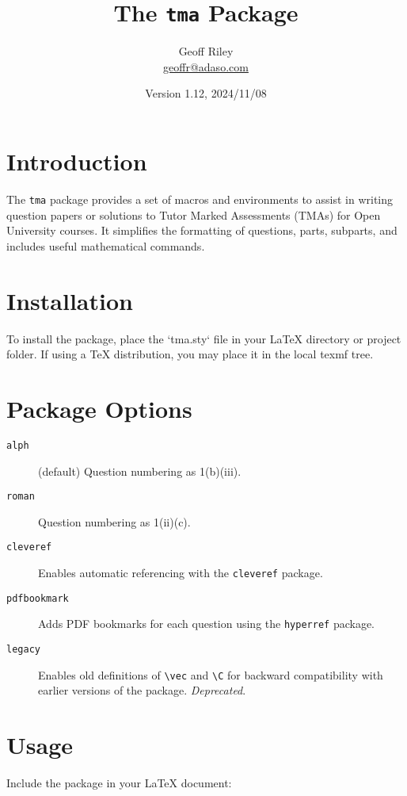 \documentclass{article}
\title{The \texttt{tma} Package}
\author{Geoff Riley \\ \href{mailto:geoffr@adaso.com.com}{geoffr@adaso.com}}
\date{Version 1.12, 2024/11/08}
\begin{document}
	
	\maketitle
	
	\tableofcontents
	
	\section{Introduction}
	
	The \texttt{tma} package provides a set of macros and environments to assist in writing question papers or solutions to Tutor Marked Assessments (TMAs) for Open University courses. It simplifies the formatting of questions, parts, subparts, and includes useful mathematical commands.
	
	\section{Installation}
	
	To install the package, place the `tma.sty` file in your LaTeX directory or project folder. If using a TeX distribution, you may place it in the local texmf tree.
	
	\section{Package Options}
	
	\begin{description}
		\item[\texttt{alph}] (default) Question numbering as 1(b)(iii).
		\item[\texttt{roman}] Question numbering as 1(ii)(c).
		\item[\texttt{cleveref}] Enables automatic referencing with the \texttt{cleveref} package.
		\item[\texttt{pdfbookmark}] Adds PDF bookmarks for each question using the \texttt{hyperref} package.
		\item[\texttt{legacy}] Enables old definitions of \verb|\vec| and \verb|\C| for backward compatibility with earlier versions of the package. \emph{Deprecated}.
	\end{description}
	
	\section{Usage}
	
	Include the package in your LaTeX document:
	
\end{document}
